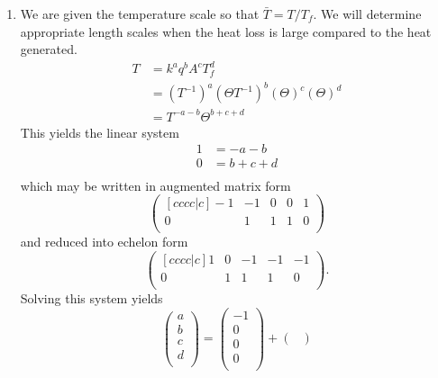\documentclass[12pt,twoside]{article}
\begin{document}
\begin{enumerate}
\item
  We are given the temperature scale so that $\bar{T}=T/T_f$. We will determine
  appropriate length scales when the heat loss is large compared to the heat
  generated.
  \begin{equation*}
    \begin{aligned}
      T &= k^aq^bA^cT_f^d \\
      &= (T^{-1})^a(\Theta T^{-1})^b(\Theta)^c(\Theta)^d \\
      &= T^{-a-b}\Theta^{b+c+d}
    \end{aligned}
  \end{equation*}
  This yields the linear system
  \begin{equation*}
    \begin{aligned}
      1 &= -a - b \\
      0 &= b + c + d \\
    \end{aligned}
  \end{equation*}
  which may be written in augmented matrix form
  \begin{equation*}
    \begin{pmatrix}[cccc|c]
      -1 & -1 & 0 & 0 & 1 \\
      0 & 1 & 1 & 1 & 0 \\
    \end{pmatrix}
  \end{equation*}
  and reduced into echelon form
  \begin{equation*}
    \begin{pmatrix}[cccc|c]
      1 & 0 & -1 & -1 & -1 \\
      0 & 1 & 1 & 1 & 0 \\
    \end{pmatrix}.
  \end{equation*}
  Solving this system yields
  \begin{equation*}
    \begin{pmatrix}
      a \\ b \\ c \\ d \\
    \end{pmatrix} =
    \begin{pmatrix}
      -1 \\ 0 \\ 0 \\ 0 \\
    \end{pmatrix} +
    \begin{pmatrix}

\end{pmatrix}
\end{equation*}
\end{enumerate}
\end{document}
